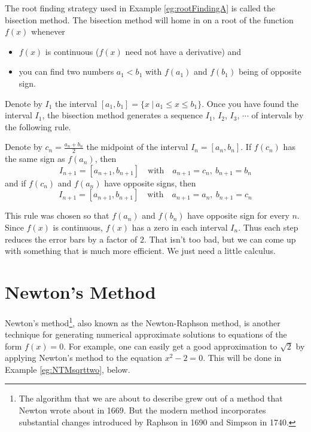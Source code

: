 The root finding strategy used in Example \ref{eg:rootFindingA} is 
called the bisection method. The bisection method will home in on a root of the
function $f(x)$ whenever
\begin{itemize}
\item
$f(x)$ is continuous ($f(x)$ need not have a derivative) and
\item
you can find two numbers $a_1<b_1$ with $f(a_1)$ and $f(b_1)$ being of opposite 
sign. 
\end{itemize}
Denote by $I_1$ the interval $[a_1,b_1]=\big\{x\ \big|\ a_1\le x\le b_1\big\}$.
Once you have found the interval $I_1$, the bisection method generates a sequence $I_1$, 
         $I_2$, 
         $I_3$, $\cdots$ 
of intervals by the following rule.
\begin{impeqn}\label{eq:APPbisection}
Denote by $c_n=\frac{a_n+b_n}{2}$ the midpoint of the interval $I_n=[a_n,b_n]$. 
If $f(c_n)$ has the same sign as $f(a_n)$, then
  \begin{equation*}
    I_{n+1}=[a_{n+1},b_{n+1}]\quad\text{with}\quad
               a_{n+1}=c_n,\  b_{n+1}=b_n
  \end{equation*}
and if 
$f(c_n)$ and $f(a_n)$ have opposite signs, then
  \begin{equation*}
    I_{n+1}=[a_{n+1},b_{n+1}]\quad\text{with}\quad
             a_{n+1}=a_n,\  b_{n+1}=c_n
  \end{equation*}
\end{impeqn}
This rule was chosen so that $f(a_n)$ and $f(b_n)$ have opposite sign for 
every $n$.
Since $f(x)$ is continuous, $f(x)$ has a zero in each interval $I_n$.
Thus each step reduces the error bars by a factor of $2$. That isn't too 
bad, but we can come up with something that is much more efficient. 
We just need a little calculus.

\section{Newton's Method}\label{sec_C_1}
Newton's method\footnote{The algorithm that we are about to describe grew out of a method that Newton wrote about in 1669. But the modern method incorporates
substantial changes introduced by Raphson in 1690 and Simpson in 1740.},  
also known as the Newton-Raphson method, is another technique for generating 
numerical approximate solutions to equations of the form $f(x)=0$. For 
example, one can easily get a good approximation to $\sqrt{2}$ by 
applying Newton's method to the equation $x^2-2=0$. This will be done in 
Example \ref{eg:NTMsqrttwo}, below.

